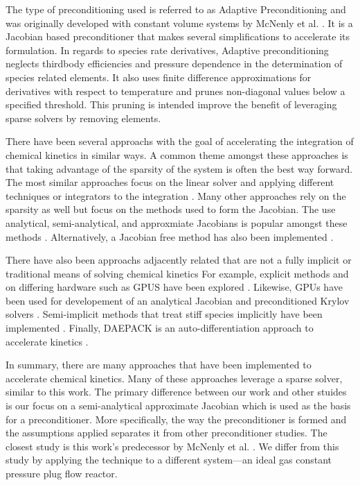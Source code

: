 The type of preconditioning used is referred to as Adaptive Preconditioning and was originally developed with constant volume systems by McNenly et al. \cite{mcnenly_faster_2015}.
It is a Jacobian based preconditioner that makes several simplifications to accelerate its formulation.
In regards to species rate derivatives, Adaptive preconditioning neglects thirdbody efficiencies and pressure dependence in the determination of species related elements.
It also uses finite difference approximations for derivatives with respect to temperature and prunes non-diagonal values below a specified threshold.
This pruning is intended improve the benefit of leveraging sparse solvers by removing elements.

There have been several approachs with the goal of accelerating the integration of chemical kinetics in similar ways.
A common theme amongst these approaches is that taking advantage of the sparsity of the system is often the best way forward.
The most similar approaches focus on the linear solver and applying different techniques or integrators to the integration \cite{liang_towards_2009, mcnenly_faster_2015, perini_study_2014, anzt_preconditioned_2017}.
Many other approaches rely on the sparsity as well but focus on the methods used to form the Jacobian.
The use analytical, semi-analytical, and approxmiate Jacobians is popular amongst these methods \cite{perini_analytical_2012,  dijkmans_gpu_2014, niemeyer_initial_2015, niemeyer_pyjac_2017, lapointe_sparse_2019, lapointe_computationally-efficient_2020}.
Alternatively, a Jacobian free method has also been implemented \cite{morii_erena_2016}.

There have also been approachs adjacently related that are not a fully implicit or traditional means of solving chemical kinetics
For example, explicit methods and on differing hardware such as GPUS have been explored \cite{niemeyer_accelerating_2014, curtis_investigation_2017}.
Likewise, GPUs have been used for developement of an analytical Jacobian and preconditioned Krylov solvers \cite{dijkmans_gpu_2014,anzt_preconditioned_2017}.
Semi-implicit methods that treat stiff species implicitly have been implemented \cite{gao_dynamic_2015, xu_sparse_2016, savard_computationally-efficient_2015}.
Finally, DAEPACK is an auto-differentiation approach to accelerate kinetics \cite{schwer_upgrading_2002}.

In summary, there are many approaches that have been implemented to accelerate chemical kinetics.
Many of these approaches leverage a sparse solver, similar to this work.
The primary difference between our work and other stuides is our focus on a semi-analytical approximate Jacobian which is used as the basis for a preconditioner.
More specifically, the way the preconditioner is formed and the assumptions applied separates it from other preconditioner studies.
The closest study is this work's predecessor by McNenly et al. \cite{mcnenly_faster_2015}.
We differ from this study by applying the technique to a different system---an ideal gas constant pressure plug flow reactor.

